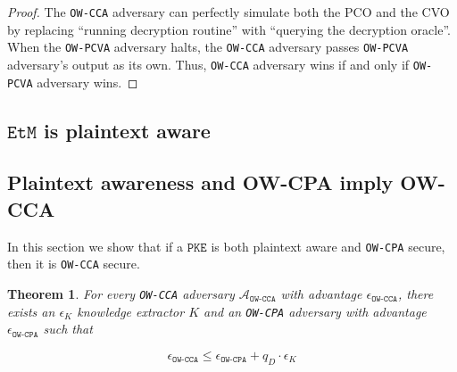 \documentclass{article}
\newcommand{\monospace}{\texttt}
\newcommand{\pke}{\monospace{PKE}}
\newcommand{\etm}{\monospace{EtM}}  %
\newtheorem{theorem}{Theorem}[section]
\begin{document}
\begin{proof}
    The \monospace{OW-CCA} adversary can perfectly simulate both the PCO and the CVO by replacing ``running decryption routine'' with ``querying the decryption oracle''. When the \monospace{OW-PCVA} adversary halts, the \monospace{OW-CCA} adversary passes \monospace{OW-PCVA} adversary's output as its own. Thus, \monospace{OW-CCA} adversary wins if and only if \monospace{OW-PCVA} adversary wins.
\end{proof}

\subsection{$\etm$ is plaintext aware}\label{sec:etm-is-pa}

\subsection{Plaintext awareness and OW-CPA imply OW-CCA}\label{sec:pa-and-owcpa-imply-owcca}
In this section we show that if a $\pke$ is both plaintext aware and \monospace{OW-CPA} secure, then it is \monospace{OW-CCA} secure.

\begin{theorem}\label{thm:pa-implies-cca}
    For every \monospace{OW-CCA} adversary $\mathcal{A}_\monospace{OW-CCA}$ with advantage $\epsilon_\monospace{OW-CCA}$, there exists an $\epsilon_K$ knowledge extractor $K$ and an \monospace{OW-CPA} adversary with advantage $\epsilon_\monospace{OW-CPA}$ such that

    \begin{equation*}
        \epsilon_\monospace{OW-CCA} \leq \epsilon_\monospace{OW-CPA} + q_D \cdot \epsilon_K
    \end{equation*}
\end{theorem}
\end{document}
